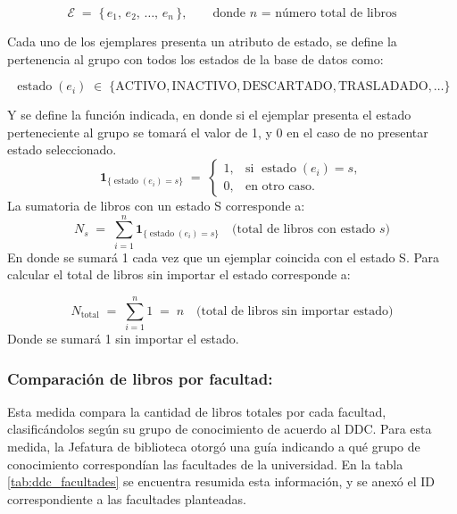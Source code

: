 \documentclass[spanish]{ieee_upb}
\begin{document}
\[
  \mathcal{E} \;=\; \{\, e_1,\,e_2,\,\dots,\,e_n \,\},
\qquad
\text{donde } n \text{ = número total de libros}
\]

Cada uno de los ejemplares presenta un atributo de estado, se define la pertenencia al grupo con todos los estados de la base de datos como:

\[
  \operatorname{estado}(e_i)\;\in\;
  \{\text{ACTIVO},\text{INACTIVO},\text{DESCARTADO},\text{TRASLADADO},\dots\}
\]

Y se define la función indicada, en donde si el ejemplar presenta el estado perteneciente al grupo se tomará el valor de 1, y 0 en el caso de no presentar estado seleccionado. 
\[
  \mathbf 1_{\{\operatorname{estado}(e_i)=s\}}
  \;=\;
  \begin{cases}
    1, & \text{si } \operatorname{estado}(e_i)=s,\\[4pt]
    0, & \text{en otro caso.}
  \end{cases}
\]
La sumatoria de libros con un estado S corresponde a:
\[
  N_s
  \;=\;
  \sum_{i=1}^{n}
    \mathbf 1_{\{\operatorname{estado}(e_i)=s\}}
  \quad
  \bigl(\text{total de libros con estado } s\bigr)
\]
En donde se sumará 1 cada vez que un ejemplar coincida con el estado S. Para calcular el total de libros sin importar el estado corresponde a:

\[
  N_{\text{total}}
  \;=\;
  \sum_{i=1}^{n} 1
  \;=\; n
  \quad
  \bigl(\text{total de libros sin importar estado}\bigr)
\]
Donde se sumará 1 sin importar el estado. 


\subsubsection{Comparación de libros por facultad:}
Esta medida compara la cantidad de libros totales por cada facultad, clasificándolos según su grupo de conocimiento de acuerdo al DDC. Para esta medida, la Jefatura de biblioteca otorgó una guía indicando a qué grupo de conocimiento correspondían las facultades de la universidad. En la tabla \ref{tab:ddc_facultades} se encuentra resumida esta información, y se anexó el ID correspondiente a las facultades planteadas. 
\end{document}
